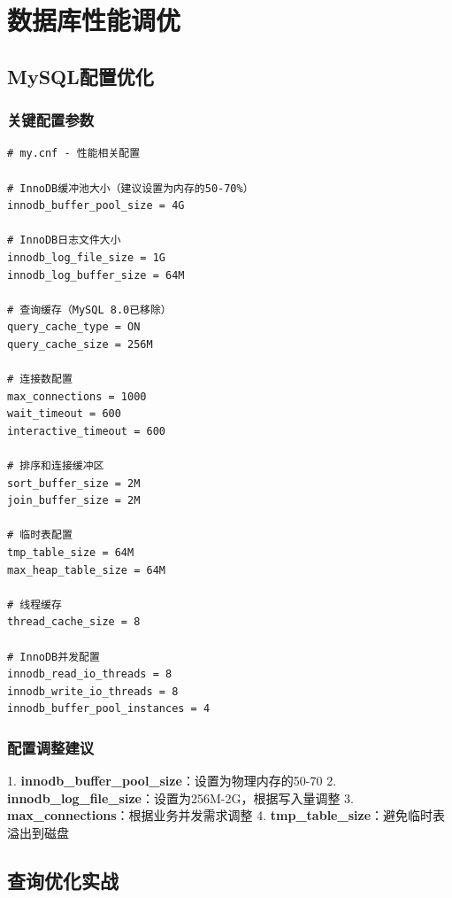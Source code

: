 \documentclass[12pt,UTF8]{ctexbook}
\begin{document}
\chapter{数据库性能调优}
\label{chap:db-tuning}

\section{MySQL配置优化}
\label{sec:mysql-config-tuning}

\subsection*{关键配置参数}

\begin{lstlisting}
# my.cnf - 性能相关配置

# InnoDB缓冲池大小（建议设置为内存的50-70%）
innodb_buffer_pool_size = 4G

# InnoDB日志文件大小
innodb_log_file_size = 1G
innodb_log_buffer_size = 64M

# 查询缓存（MySQL 8.0已移除）
query_cache_type = ON
query_cache_size = 256M

# 连接数配置
max_connections = 1000
wait_timeout = 600
interactive_timeout = 600

# 排序和连接缓冲区
sort_buffer_size = 2M
join_buffer_size = 2M

# 临时表配置
tmp_table_size = 64M
max_heap_table_size = 64M

# 线程缓存
thread_cache_size = 8

# InnoDB并发配置
innodb_read_io_threads = 8
innodb_write_io_threads = 8
innodb_buffer_pool_instances = 4
\end{lstlisting}

\subsection*{配置调整建议}

1. \textbf{innodb\_buffer\_pool\_size}：设置为物理内存的50-70%
2. \textbf{innodb\_log\_file\_size}：设置为256M-2G，根据写入量调整
3. \textbf{max\_connections}：根据业务并发需求调整
4. \textbf{tmp\_table\_size}：避免临时表溢出到磁盘

\section{查询优化实战}
\label{sec:query-optimization}
\end{document}
